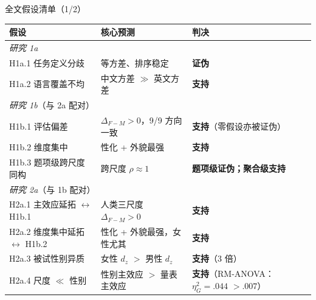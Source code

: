 \documentclass[aspectratio=169,professionalfonts]{beamer}
\begin{document}
\begin{frame}{全文假设清单（1/2）}
  \scriptsize
  \setlength{\tabcolsep}{4pt}
  \begin{table}
    \centering
    \begin{tabular}{lll}
      \toprule
      假设 & 核心预测 & 判决 \\
      \midrule
      \multicolumn{3}{l}{\textit{研究 1a}} \\
      H1a.1 任务定义分歧 & 等方差、排序稳定 & \textbf{证伪} \\
      H1a.2 语言覆盖不均 & 中文方差 $\gg$ 英文方差 & \textbf{支持} \\
      \midrule
      \multicolumn{3}{l}{\textit{研究 1b}（与 2a 配对）} \\
      H1b.1 评估偏差 & $\Delta_{F-M} > 0$，9/9 方向一致 & \textbf{支持}（零假设亦被证伪） \\
      H1b.2 维度集中 & 性化 + 外貌最强 & \textbf{支持} \\
      H1b.3 题项级跨尺度同构 & 跨尺度 $\rho \approx 1$ & \textbf{题项级证伪；聚合级支持} \\
      \midrule
      \multicolumn{3}{l}{\textit{研究 2a}（与 1b 配对）} \\
      H2a.1 主效应延拓 $\leftrightarrow$ H1b.1 & 人类三尺度 $\Delta_{F-M}>0$ & \textbf{支持} \\
      H2a.2 维度集中延拓 $\leftrightarrow$ H1b.2 & 性化 + 外貌最强，女性尤其 & \textbf{支持} \\
      H2a.3 被试性别异质 & 女性 $d_z$ $>$ 男性 $d_z$ & \textbf{支持}（3 倍） \\
      H2a.4 尺度 $\ll$ 性别 & 性别主效应 $>$ 量表主效应 & \textbf{支持}（RM-ANOVA：$\eta_G^2=.044$ $> .007$） \\
      \bottomrule
    \end{tabular}
  \end{table}
\end{frame}
\end{document}
